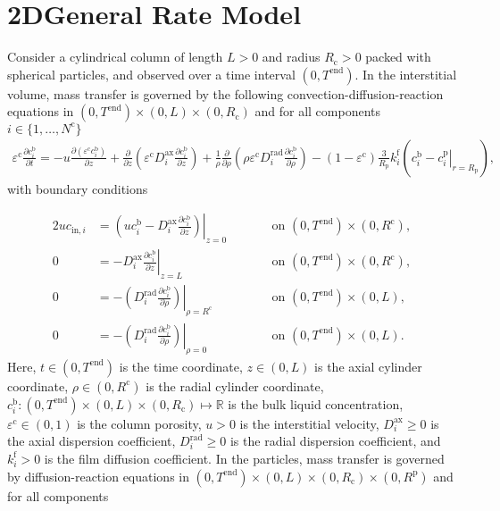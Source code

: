 \documentclass{article}
\begin{document}
\section*{2DGeneral Rate Model}
Consider a cylindrical column of length $L > 0$  and radius $R_{\mathrm{c}} > 0$ packed with spherical particles, and observed over a time interval $(0, T^{\mathrm{end}})$.
In the interstitial volume, mass transfer is governed by the following convection-diffusion-reaction equations in $(0, T^\mathrm{end})\times (0, L)\times (0, R_\mathrm{c})$ and for all components $i\in\{1, \dots, N^{\mathrm{c}} \}$
\begin{align}
\varepsilon^{\mathrm{c}} \frac{\partial c^{\mathrm{b}}_i}{\partial t} = - u \frac{\partial \left( \varepsilon^{\mathrm{c}} c^{\mathrm{b}}_i \right)}{\partial z} + \frac{\partial}{\partial z} \left( \varepsilon^{\mathrm{c}} D^{\mathrm{ax}}_{i} \frac{\partial c^{\mathrm{b}}_i}{\partial z} \right) + \frac{1}{\rho} \frac{\partial}{\partial \rho} \left( \rho \varepsilon^{\mathrm{c}} D^{\mathrm{rad}}_{i}  \frac{\partial c^{\mathrm{b}}_i}{\partial \rho} \right)- \left(1 - \varepsilon^{\mathrm{c}} \right) \frac{3}{R_{\mathrm{p}}} k^{\mathrm{f}}_{i} \left(c^{\mathrm{b}}_i - \left. c^{\mathrm{p}}_{i} \right|_{r = R_{\mathrm{p}}} \right),
\end{align}
with boundary conditions

\begin{alignat}{2}
u c_{\mathrm{in},i} &= \left.\left( u c^{\mathrm{b}}_i - D^{\mathrm{ax}}_{i} \frac{\partial c^{\mathrm{b}}_i}{\partial z}\right)\right|_{z=0} & &\qquad\text{on }(0, T^{\mathrm{end}})\times (0, R^{\mathrm{c}}),\\
               0 &= - D^{\mathrm{ax}}_{i} \left. \frac{\partial c^{\mathrm{b}}_i}{\partial z} \right|_{z=L} & &\qquad\text{on }(0, T^{\mathrm{end}})\times (0, R^{\mathrm{c}}),\\
0 &= - \left(D^{\mathrm{rad}}_{i} \left. \frac{\partial c^{\mathrm{b}}_i}{\partial \rho} \right) \right|_{\rho=R^{\mathrm{c}}} & &\qquad\text{on }(0, T^{\mathrm{end}}) \times (0, L),\\
0 &= - \left(D^{\mathrm{rad}}_{i} \left. \frac{\partial c^{\mathrm{b}}_i}{\partial \rho} \right) \right|_{\rho=0} & &\qquad\text{on }(0, T^{\mathrm{end}}) \times (0, L).
\end{alignat}
Here, $t\in (0, T^{\mathrm{end}})$ is the time coordinate, $z\in (0, L)$ is the axial cylinder coordinate, $\rho\in (0, R^{\mathrm{c}})$ is the radial cylinder coordinate, $c^{\mathrm{b}}_i\colon (0, T^\mathrm{end})\times (0, L)\times (0, R_\mathrm{c}) \mapsto \mathbb{R}$ is the bulk liquid concentration, $\varepsilon^{\mathrm{c}}\in (0, 1)$ is the column porosity, $u> 0$ is the interstitial velocity, $D^\mathrm{ax}_i\geq 0$ is the axial dispersion coefficient, $D^\mathrm{rad}_i\geq 0$ is the radial dispersion coefficient, and $k^\mathrm{f}_{i}> 0$ is the film diffusion coefficient.
In the particles, mass transfer is governed by diffusion-reaction equations in $ (0, T^\mathrm{end}) \times (0, L)\times (0, R_\mathrm{c})\times (0, R^{\mathrm{p}})$ and for all components
\end{document}
